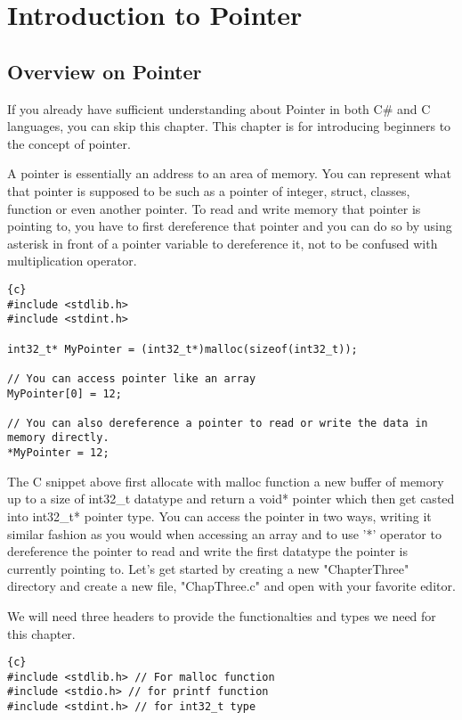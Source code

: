 \chapter{Introduction to Pointer}
\section{Overview on Pointer}
If you already have sufficient understanding about Pointer in both C\# and C languages, you can skip this chapter. This chapter is for introducing beginners to the concept of pointer.

A pointer is essentially an address to an area of memory. You can represent what that pointer is supposed to be such as a pointer of integer, struct, classes, function or even another pointer.
To read and write memory that pointer is pointing to, you have to first dereference that pointer and you can do so by using asterisk in front of a pointer variable to dereference it, not to be confused with multiplication operator.

\begin{lstlisting}{c}
#include <stdlib.h>
#include <stdint.h>

int32_t* MyPointer = (int32_t*)malloc(sizeof(int32_t));

// You can access pointer like an array
MyPointer[0] = 12;

// You can also dereference a pointer to read or write the data in memory directly.
*MyPointer = 12;
\end{lstlisting}

The C snippet above first allocate with malloc function a new buffer of memory up to a size of int32\_t datatype and return a void* pointer which then get casted into int32\_t* pointer type. You can access the pointer in two ways, writing it similar fashion as you would when accessing an array and to use '*' operator to dereference the pointer to read and write the first datatype the pointer is currently pointing to.
\newpage
Let's get started by creating a new "ChapterThree" directory and create a new file, "ChapThree.c" and open with your favorite editor.

We will need three headers to provide the functionalties and types we need for this chapter.

\begin{lstlisting}{c}
#include <stdlib.h> // For malloc function
#include <stdio.h> // for printf function
#include <stdint.h> // for int32_t type
\end{lstlisting}

